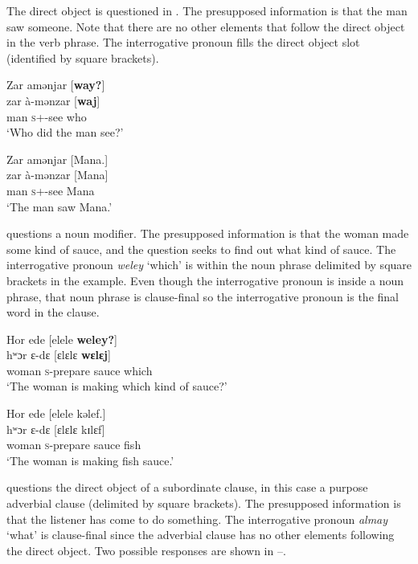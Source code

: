 \largerpage The direct object is questioned in . The presupposed information is that the man saw someone. Note that there are no other elements that follow the direct object in the verb phrase. The interrogative pronoun fills the direct object slot (identified by square brackets). 


\ea \label{ex:10:53}
Zar  amənjar  [\textbf{way?}]\\
\gll  zar     à-mənzar   [\textbf{waj}]\\
      man    \textsc{s}+{\PFV}-see  who\\
\glt  ‘Who did the man see?’ 
\z

\ea \label{ex:10:54}
Zar  amənjar  [Mana.]\\
\gll  zar     à-mənzar   [Mana]\\
      man    \textsc{s}+{\PFV}-see  Mana\\
\glt  ‘The man saw Mana.’ 
\z

 questions a noun modifier. The presupposed information is that the woman made some kind of sauce, and the question seeks to find out what kind of sauce. The interrogative pronoun \textit{weley} ‘which’ is within the noun phrase delimited by square brackets in the example. Even though the interrogative pronoun is inside a noun phrase, that noun phrase is clause-final so the interrogative pronoun is the final word in the clause. 

\ea \label{ex:10:55}
Hor  ede  [elele  \textbf{weley?}]\\
\gll  hʷɔr    ɛ-dɛ    [ɛlɛlɛ  \textbf{wɛlɛj}]\\
      woman  \textsc{s}-prepare  sauce  which\\
\glt  ‘The woman is making which kind of sauce?’
\z

\ea \label{ex:10:56}
Hor  ede  [elele  kəlef.]\\
\gll  hʷɔr    ɛ{}-dɛ    [ɛlɛlɛ  kɪlɛf]\\
      woman  \textsc{s}-prepare  sauce  fish\\
\glt  ‘The woman is making fish sauce.’
\z

 questions the direct object of a subordinate clause, in this case a purpose adverbial clause (delimited by square brackets). The presupposed information is that the listener has come to do something. The interrogative pronoun \textit{almay}  ‘what’ is clause-final since the adverbial clause has no other elements following the direct object. Two possible responses are shown in --.

